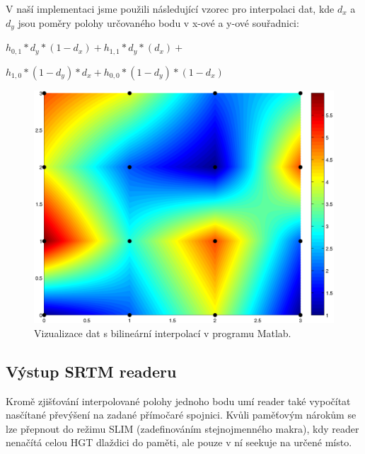 \documentclass[thesis=B,czech]{FITthesis}[2012/06/26]
\begin{document}
V naší implementaci jsme použili následující vzorec pro interpolaci dat, kde $d_x$ a $d_y$ jsou poměry polohy určovaného bodu v x-ové a y-ové souřadnici:

$h_{0,1} * d_y * (1 - d_x) + h_{1,1} * d_y * (d_x) + $

$h_{1,0} * (1 - d_y) * d_x + h_{0,0} * (1 - d_y) * (1 - d_x) $



\begin{figure}[]
\centering
\includegraphics[width=\textwidth]{obrazky/bilinearni-interpolace.png}
\caption{Vizualizace dat s bilineární interpolací v programu Matlab. }
\label{img:interpolace}
\end{figure}



\subsection{Výstup SRTM readeru}
Kromě zjišťování interpolované polohy jednoho bodu umí reader také vypočítat nasčítané převýšení na zadané přímočaré spojnici. Kvůli paměťovým nárokům se lze přepnout do režimu SLIM (zadefinováním stejnojmenného makra), kdy reader nenačítá celou HGT dlaždici do paměti, ale pouze v ní seekuje na určené místo.
\end{document}
